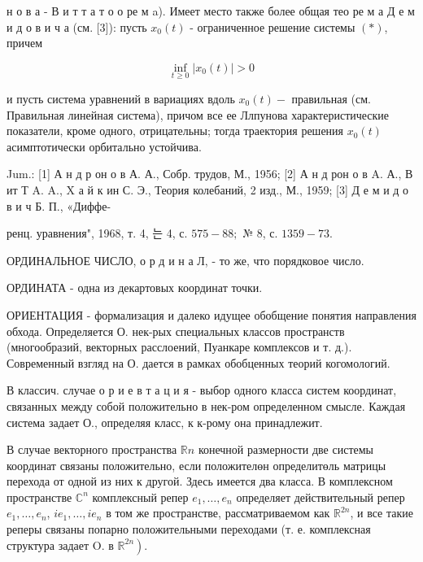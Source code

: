 \documentclass[10pt]{article}
\begin{document}
н о в а - В и т т а т о о ре м a). Имеет место также более общая тео ре м а Д е м и д о в и ч а (см. [3]): пусть $x_{0}(t)$ - ограниченное решение системы $(*)$, причем



\[

\inf _{t \geqslant 0}\left|x_{0}(t)\right|>0

\]



и пусть система уравнений в вариациях вдоль $x_{0}(t)-$ правильная (см. Правильная линейная система), причом все ее Ллпунова характеристические показатели, кроме одного, отрицательны; тогда траектория решения $x_{0}(t)$ асимптотически орбитально устойчива.



Jum.: [1] А н д р он о в А. А., Собр. трудов, М., 1956; [2] А н д рон о в A. А., В ит Т A. A., X а й к ин С. Э., Теория колебаний, 2 изд., М., 1959; [3] Д е м и д о в и ч Б. П., «Диффе-

ренц. уравнения", 1968, т. 4, 는 4, с. $575-88 ;$ № 8, с. $1359-73$.



ОРДИНАЛЬНОЕ ЧИСЛО, о р д и н а Л, - то же, что порядковое число.



ОРДИНАТА - одна из декартовых координат точки.



ОРИЕНТАЦИЯ - формализация и далеко идущее обобщение понятия направления обхода. Определяется О. нек-рых специальных классов пространств (многообразий, векторных расслоений, Пуанкаре комплексов и т. д.). Современный взгляд на О. дается в рамках обобценных теорий когомологий.



В классич. случае о р и е в т а ц и я - выбор одного класса систем координат, связанных между собой положительно в нек-ром определенном смысле. Каждая система задает О., определяя класс, к к-рому она принадлежит.



В случае векторного пространства $\mathbb{R} n$ конечной размерности две системы координат связаны положительно, если положителөн определитөль матрицы перехода от одной из них к другой. Здесь имеется два класса. В комплексном пространстве $\mathbb{C}^{n}$ комплексный репер $e_{1}, \ldots, e_{n}$ определяет действительный репер $e_{1}, \ldots, e_{n}$, $i e_{1}, \ldots, i e_{n}$ в том же пространстве, рассматриваемом как $\mathbb{R}^{2 n}$, и все такие реперы связаны попарно положительными переходами (т. е. комплексная структура задает O. в $\left.\mathbb{R}^{2 n}\right)$.
\end{document}
